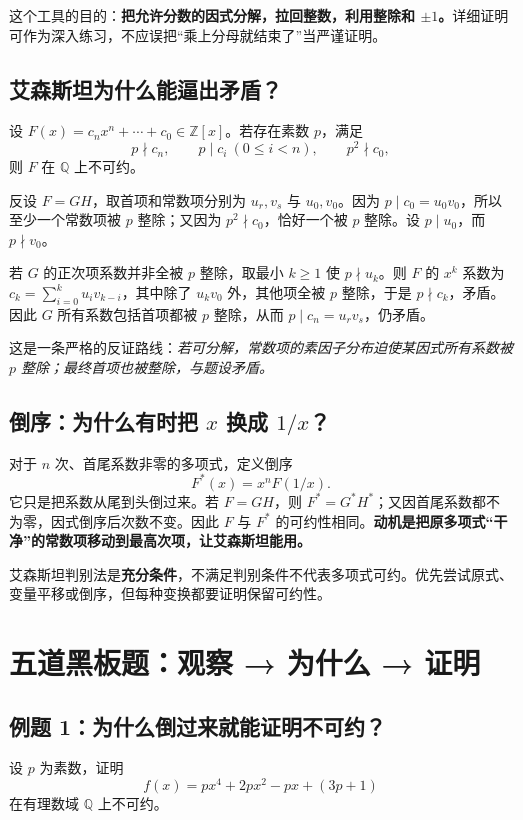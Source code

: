 \documentclass[12pt,a4paper,UTF8,fontset=none]{ctexart}
\begin{document}
这个工具的目的：\textbf{把允许分数的因式分解，拉回整数，利用整除和 $\pm1$。}详细证明可作为深入练习，不应误把“乘上分母就结束了”当严谨证明。

\subsection{艾森斯坦为什么能逼出矛盾？}
设 $F(x)=c_nx^n+\cdots+c_0\in\mathbb Z[x]$。若存在素数 $p$，满足
\[
 p\nmid c_n,\qquad p\mid c_i\ (0\le i<n),\qquad p^2\nmid c_0,
\]
则 $F$ 在 $\mathbb Q$ 上不可约。

\begin{whybox}
反设 $F=GH$，取首项和常数项分别为 $u_r,v_s$ 与 $u_0,v_0$。因为 $p\mid c_0=u_0v_0$，所以至少一个常数项被 $p$ 整除；又因为 $p^2\nmid c_0$，恰好一个被 $p$ 整除。设 $p\mid u_0$，而 $p\nmid v_0$。\par
若 $G$ 的正次项系数并非全被 $p$ 整除，取最小 $k\ge1$ 使 $p\nmid u_k$。则 $F$ 的 $x^k$ 系数为 $c_k=\sum_{i=0}^k u_i v_{k-i}$，其中除了 $u_kv_0$ 外，其他项全被 $p$ 整除，于是 $p\nmid c_k$，矛盾。因此 $G$ 所有系数包括首项都被 $p$ 整除，从而 $p\mid c_n=u_rv_s$，仍矛盾。
\end{whybox}

这是一条严格的反证路线：\emph{若可分解，常数项的素因子分布迫使某因式所有系数被 $p$ 整除；最终首项也被整除，与题设矛盾。}

\subsection{倒序：为什么有时把 $x$ 换成 $1/x$？}
对于 $n$ 次、首尾系数非零的多项式，定义倒序
\[
F^*(x)=x^nF(1/x).
\]
它只是把系数从尾到头倒过来。若 $F=GH$，则 $F^*=G^*H^*$；又因首尾系数都不为零，因式倒序后次数不变。因此 $F$ 与 $F^*$ 的可约性相同。\textbf{动机是把原多项式“干净”的常数项移动到最高次项，让艾森斯坦能用。}

\begin{trapbox}
艾森斯坦判别法是\textbf{充分条件}，不满足判别条件不代表多项式可约。优先尝试原式、变量平移或倒序，但每种变换都要证明保留可约性。
\end{trapbox}

\section{五道黑板题：观察 → 为什么 → 证明}
\subsection{例题 1：为什么倒过来就能证明不可约？}
\begin{questionbox}[黑板例题 1]
设 $p$ 为素数，证明
\[
f(x)=px^4+2px^2-px+(3p+1)
\]
在有理数域 $\mathbb Q$ 上不可约。
\end{questionbox}
\end{document}
